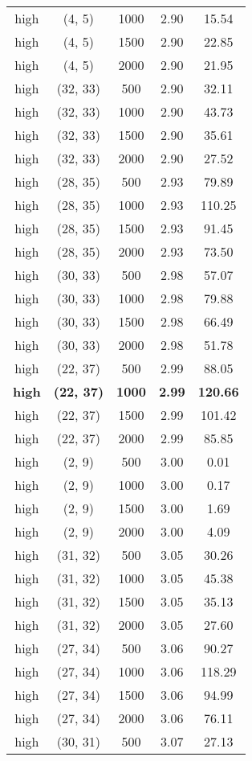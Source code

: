 \begin{tabular}{c c c c c}
high & (4, 5) &  1000 & 2.90 & 15.54 \\
high & (4, 5) &  1500 & 2.90 & 22.85 \\
high & (4, 5) &  2000 & 2.90 & 21.95 \\
high & (32, 33) &  500 & 2.90 & 32.11 \\
high & (32, 33) &  1000 & 2.90 & 43.73 \\
high & (32, 33) &  1500 & 2.90 & 35.61 \\
high & (32, 33) &  2000 & 2.90 & 27.52 \\
high & (28, 35) &  500 & 2.93 & 79.89 \\
high & (28, 35) &  1000 & 2.93 & 110.25 \\
high & (28, 35) &  1500 & 2.93 & 91.45 \\
high & (28, 35) &  2000 & 2.93 & 73.50 \\
high & (30, 33) &  500 & 2.98 & 57.07 \\
high & (30, 33) &  1000 & 2.98 & 79.88 \\
high & (30, 33) &  1500 & 2.98 & 66.49 \\
high & (30, 33) &  2000 & 2.98 & 51.78 \\
high & (22, 37) &  500 & 2.99 & 88.05 \\
\textbf{high} & \textbf{(22, 37)} & \textbf{ 1000} & \textbf{2.99} & \textbf{120.66} \\
high & (22, 37) &  1500 & 2.99 & 101.42 \\
high & (22, 37) &  2000 & 2.99 & 85.85 \\
high & (2, 9) &  500 & 3.00 & 0.01 \\
high & (2, 9) &  1000 & 3.00 & 0.17 \\
high & (2, 9) &  1500 & 3.00 & 1.69 \\
high & (2, 9) &  2000 & 3.00 & 4.09 \\
high & (31, 32) &  500 & 3.05 & 30.26 \\
high & (31, 32) &  1000 & 3.05 & 45.38 \\
high & (31, 32) &  1500 & 3.05 & 35.13 \\
high & (31, 32) &  2000 & 3.05 & 27.60 \\
high & (27, 34) &  500 & 3.06 & 90.27 \\
high & (27, 34) &  1000 & 3.06 & 118.29 \\
high & (27, 34) &  1500 & 3.06 & 94.99 \\
high & (27, 34) &  2000 & 3.06 & 76.11 \\
high & (30, 31) &  500 & 3.07 & 27.13 \\

\end{tabular}
